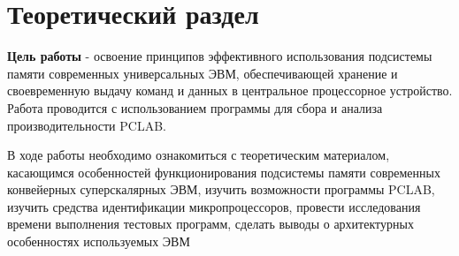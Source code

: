 \chapter{Теоретический раздел}

    \textbf{Цель   работы}   -  освоение принципов эффективного использования подсистемы памяти современных универсальных ЭВМ, обеспечивающей хранение и своевременную выдачу команд и данных в центральное процессорное устройство. Работа проводится с использованием программы для сбора и анализа производительности PCLAB. 

    В ходе работы необходимо ознакомиться с теоретическим материалом, касающимся особенностей   функционирования   подсистемы   памяти   современных   конвейерных суперскалярных   ЭВМ,   изучить   возможности   программы  PCLAB,   изучить   средства идентификации микропроцессоров, провести исследования времени выполнения тестовых программ, сделать выводы о архитектурных особенностях используемых ЭВМ